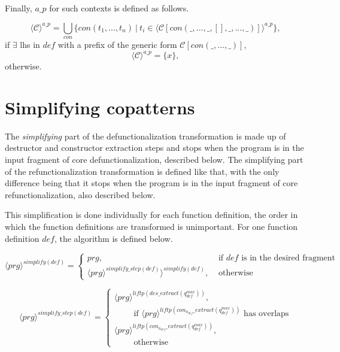 Finally, $a\_p$ for such contexts is defined as follows.

\begin{equation*}
\langle \mathcal{C} \rangle^{a\_p} = \bigcup_{con} \{con(t_1, ..., t_n) ~ | ~ t_i \in \langle \mathcal{C}[con(\_, ..., \_, [], \_, ..., \_)] \rangle^{a\_p} \},
\end{equation*}
if $\exists$ lhs in $def$ with a prefix of the generic form $\mathcal{C}[con(\_, ..., \_)]$,
\begin{equation*}
\langle \mathcal{C} \rangle^{a\_p} = \{x\},
\end{equation*}
otherwise.

\section{Simplifying copatterns}

The \textit{simplifying} part of the defunctionalization transformation is made up of destructor and constructor extraction steps and stops when the program is in the input fragment of core defunctionalization, described below. The simplifying part of the refunctionalization transformation is defined like that, with the only difference being that it stops when the program is in the input fragment of core refunctionalization, also described below.

This simplification is done individually for each function definition, the order in which the function definitions are transformed is unimportant. For one function definition $def$, the algorithm is defined below.

\[
  \langle prg \rangle^{simplify(def)}=\begin{cases}
               prg, &\text{ if $def$ is in the desired fragment}\\
               \langle prg \rangle^{simplify\_step(def)} \rangle^{simplify(def)}, &\text{ otherwise}
            \end{cases}
\]

\[
  \langle prg \rangle^{simplify\_step(def)}=\begin{cases}
               \langle prg \rangle^{liftp(des\_extract(q^{max}_{def}))}, \\
               \qquad\text{ if } \langle prg \rangle^{liftp(con_{n_{def}}\_extract(q^{max}_{def}))} \text{ has overlaps}\\
               \langle prg \rangle^{liftp(con_{n_{def}}\_extract(q^{max}_{def}))},\\
               \qquad\text{ otherwise}
            \end{cases}
\]

